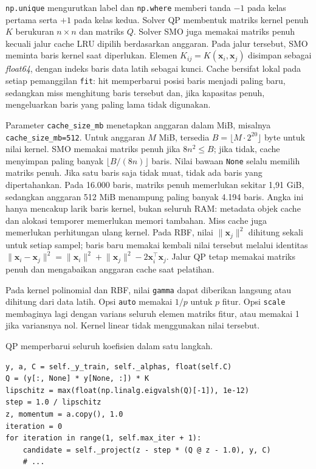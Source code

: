 \texttt{np.unique} mengurutkan label dan \texttt{np.where} memberi tanda
$-1$ pada kelas pertama serta $+1$ pada kelas kedua. Solver QP membentuk
matriks kernel penuh $K$ berukuran $n\times n$ dan matriks $Q$. Solver SMO
juga memakai matriks penuh kecuali jalur cache LRU dipilih berdasarkan anggaran.
Pada jalur tersebut, SMO meminta baris kernel saat diperlukan. Elemen
$K_{ij}=K(\mathbf{x}_i,\mathbf{x}_j)$ disimpan sebagai \textit{float64},
dengan indeks baris data latih sebagai kunci. Cache bersifat lokal pada setiap
pemanggilan \texttt{fit}: hit memperbarui posisi baris menjadi paling baru,
sedangkan miss menghitung baris tersebut dan, jika kapasitas penuh,
mengeluarkan baris yang paling lama tidak digunakan.

Parameter \texttt{cache\_size\_mb} menetapkan anggaran dalam MiB, misalnya
\texttt{cache\_size\_mb=512}. Untuk anggaran $M$ MiB, tersedia $B=\lfloor M\cdot 2^{20}\rfloor$
byte untuk nilai kernel. SMO memakai matriks penuh jika $8n^2\le B$;
jika tidak, cache menyimpan paling banyak $\lfloor B/(8n)\rfloor$ baris.
Nilai bawaan \texttt{None} selalu memilih matriks penuh. Jika satu baris saja tidak
muat, tidak ada baris yang dipertahankan. Pada 16.000 baris, matriks penuh
memerlukan sekitar 1,91 GiB, sedangkan anggaran 512 MiB menampung paling banyak
4.194 baris. Angka ini hanya mencakup larik baris kernel, bukan seluruh RAM:
metadata objek cache dan alokasi temporer memerlukan memori tambahan. Miss
cache juga memerlukan perhitungan ulang kernel. Pada RBF, nilai
$\lVert\mathbf{x}_j\rVert^2$ dihitung sekali untuk setiap sampel; baris baru
memakai kembali nilai tersebut melalui identitas
$\lVert\mathbf{x}_i-\mathbf{x}_j\rVert^2 =
\lVert\mathbf{x}_i\rVert^2+\lVert\mathbf{x}_j\rVert^2-2\mathbf{x}_i^\top\mathbf{x}_j$.
Jalur QP tetap memakai matriks penuh dan mengabaikan anggaran cache saat
pelatihan.

Pada kernel polinomial dan RBF, nilai \texttt{gamma} dapat diberikan langsung
atau dihitung dari data latih. Opsi \texttt{auto} memakai $1/p$ untuk $p$
fitur. Opsi \texttt{scale} membaginya lagi dengan varians seluruh elemen
matriks fitur, atau memakai 1 jika variansnya nol. Kernel linear tidak
menggunakan nilai tersebut.

QP memperbarui seluruh koefisien dalam satu langkah.

\begin{lstlisting}[caption={Langkah gradien terproyeksi pada SVM}, label={lst:svm-qp}]
y, a, C = self._y_train, self._alphas, float(self.C)
Q = (y[:, None] * y[None, :]) * K
lipschitz = max(float(np.linalg.eigvalsh(Q)[-1]), 1e-12)
step = 1.0 / lipschitz
z, momentum = a.copy(), 1.0
iteration = 0
for iteration in range(1, self.max_iter + 1):
    candidate = self._project(z - step * (Q @ z - 1.0), y, C)
    # ...
\end{lstlisting}

